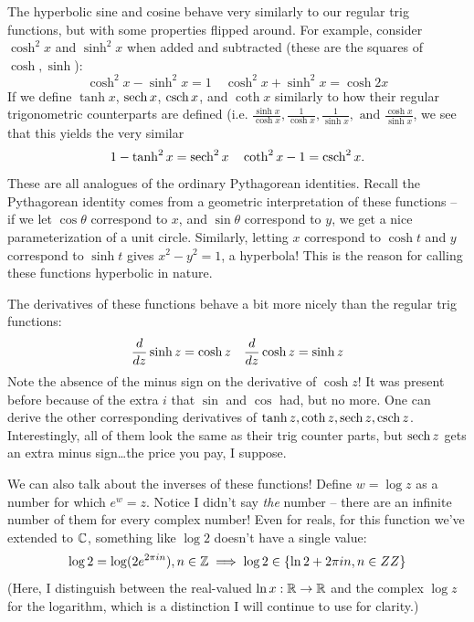 The hyperbolic sine and cosine behave very similarly to our regular trig functions, but with some properties flipped around. For example, consider $\cosh^2 x$ and $\sinh^2 x$ when added and subtracted (these are the squares of $\cosh, \sinh$):
\[
    \cosh^2 x - \sinh^2 x = 1 \quad \cosh^2 x + \sinh^2 x = \cosh 2x
\]
If we define $\tanh x$, $\operatorname{\mathrm{sech}} x$, $\operatorname{\mathrm{csch}} x$, and $\coth x$ similarly to how their regular trigonometric counterparts are defined (i.e. $\frac{\sinh x}{\cosh x}, \frac{1}{\cosh x}, \frac{1}{\sinh x}, \text{ and } \frac{\cosh x}{\sinh x}$, we see that this yields the very similar
\[
    1 - \tanh^2 x = \operatorname{\mathrm{sech}}^2 x \quad \coth^2 x - 1 = \operatorname{\mathrm{csch}}^2 x.
\]
These are all analogues of the ordinary Pythagorean identities.  Recall the Pythagorean identity comes from a geometric interpretation of these functions -- if we let $\cos \theta$ correspond to $x$, and $\sin \theta$ correspond to $y$, we get a nice parameterization of a unit circle. Similarly, letting $x$ correspond to $\cosh t$ and $y$ correspond to $\sinh t$ gives $x^2 - y^2 = 1$, a hyperbola! This is the reason for calling these functions hyperbolic in nature.

The derivatives of these functions behave a bit more nicely than the regular trig functions:
\[
    \frac{d }{d z} \sinh z = \cosh z \quad \frac{d }{d z} \cosh z = \sinh z
\]
Note the absence of the minus sign on the derivative of $\cosh z$! It was present before because of the extra $i$ that $\sin$ and $\cos$ had, but no more. One can derive the other corresponding derivatives of $\tanh z, \coth z, \operatorname{\mathrm{sech}} z, \operatorname{\mathrm{csch}} z$. Interestingly, all of them look the same as their trig counter parts, but $\operatorname{\mathrm{sech}} z$ gets an extra minus sign\ldots the price you pay, I suppose.

We can also talk about the inverses of these functions! Define $w = \log z$ as a number for which $e^w = z$. Notice I didn't say \textit{the} number -- there are an infinite number of them for every complex number! Even for reals, for this function we've extended to $\mathbb C$, something like $\log 2$ doesn't have a single value:
\[
    \log 2 = \log (2 e^{2\pi i n}), n\in \mathbb Z \implies \log 2 \in \{\ln 2 + 2\pi i n, n \in ZZ\}
\]
(Here, I distinguish between the real-valued $\ln x : \mathbb R \to \mathbb R$ and the complex $\log z$ for the logarithm, which is a distinction I will continue to use for clarity.)

